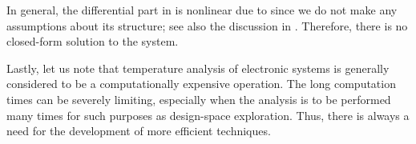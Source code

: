 In general, the differential part in  is
nonlinear due to \vp since we do not make any assumptions about its structure;
see also the discussion in . Therefore, there is no
closed-form solution to the system.

Lastly, let us note that temperature analysis of electronic systems is generally
considered to be a computationally expensive operation. The long computation
times can be severely limiting, especially when the analysis is to be performed
many times for such purposes as design-space exploration. Thus, there is always
a need for the development of more efficient techniques.
